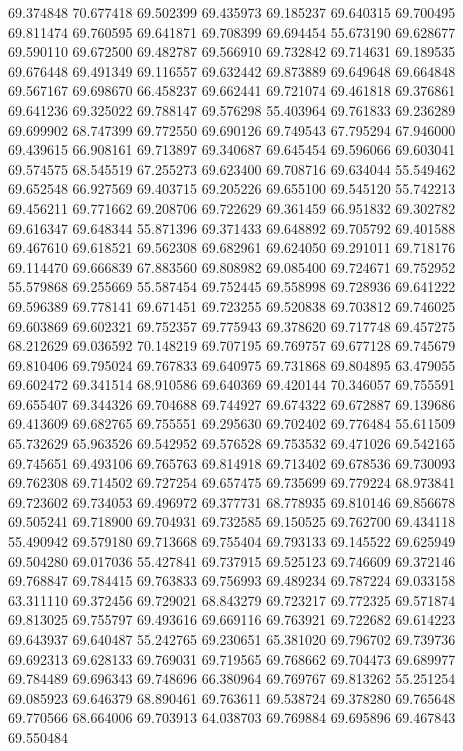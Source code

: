 69.374848
70.677418
69.502399
69.435973
69.185237
69.640315
69.700495
69.811474
69.760595
69.641871
69.708399
69.694454
55.673190
69.628677
69.590110
69.672500
69.482787
69.566910
69.732842
69.714631
69.189535
69.676448
69.491349
69.116557
69.632442
69.873889
69.649648
69.664848
69.567167
69.698670
66.458237
69.662441
69.721074
69.461818
69.376861
69.641236
69.325022
69.788147
69.576298
55.403964
69.761833
69.236289
69.699902
68.747399
69.772550
69.690126
69.749543
67.795294
67.946000
69.439615
66.908161
69.713897
69.340687
69.645454
69.596066
69.603041
69.574575
68.545519
67.255273
69.623400
69.708716
69.634044
55.549462
69.652548
66.927569
69.403715
69.205226
69.655100
69.545120
55.742213
69.456211
69.771662
69.208706
69.722629
69.361459
66.951832
69.302782
69.616347
69.648344
55.871396
69.371433
69.648892
69.705792
69.401588
69.467610
69.618521
69.562308
69.682961
69.624050
69.291011
69.718176
69.114470
69.666839
67.883560
69.808982
69.085400
69.724671
69.752952
55.579868
69.255669
55.587454
69.752445
69.558998
69.728936
69.641222
69.596389
69.778141
69.671451
69.723255
69.520838
69.703812
69.746025
69.603869
69.602321
69.752357
69.775943
69.378620
69.717748
69.457275
68.212629
69.036592
70.148219
69.707195
69.769757
69.677128
69.745679
69.810406
69.795024
69.767833
69.640975
69.731868
69.804895
63.479055
69.602472
69.341514
68.910586
69.640369
69.420144
70.346057
69.755591
69.655407
69.344326
69.704688
69.744927
69.674322
69.672887
69.139686
69.413609
69.682765
69.755551
69.295630
69.702402
69.776484
55.611509
65.732629
65.963526
69.542952
69.576528
69.753532
69.471026
69.542165
69.745651
69.493106
69.765763
69.814918
69.713402
69.678536
69.730093
69.762308
69.714502
69.727254
69.657475
69.735699
69.779224
68.973841
69.723602
69.734053
69.496972
69.377731
68.778935
69.810146
69.856678
69.505241
69.718900
69.704931
69.732585
69.150525
69.762700
69.434118
55.490942
69.579180
69.713668
69.755404
69.793133
69.145522
69.625949
69.504280
69.017036
55.427841
69.737915
69.525123
69.746609
69.372146
69.768847
69.784415
69.763833
69.756993
69.489234
69.787224
69.033158
63.311110
69.372456
69.729021
68.843279
69.723217
69.772325
69.571874
69.813025
69.755797
69.493616
69.669116
69.763921
69.722682
69.614223
69.643937
69.640487
55.242765
69.230651
65.381020
69.796702
69.739736
69.692313
69.628133
69.769031
69.719565
69.768662
69.704473
69.689977
69.784489
69.696343
69.748696
66.380964
69.769767
69.813262
55.251254
69.085923
69.646379
68.890461
69.763611
69.538724
69.378280
69.765648
69.770566
68.664006
69.703913
64.038703
69.769884
69.695896
69.467843
69.550484
